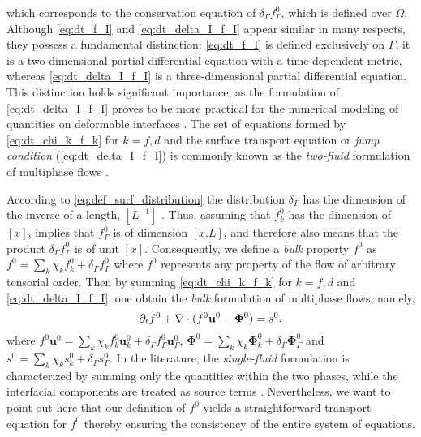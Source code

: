 which corresponds to the conservation equation of $\delta_\Gamma f_\Gamma^0$, which is defined over $\Omega$.
Although \ref{eq:dt_f_I} and \ref{eq:dt_delta_I_f_I} appear similar in many respects, they possess a fundamental distinction: \ref{eq:dt_f_I} is defined exclusively on $\Gamma$, it is a two-dimensional partial differential equation with a time-dependent metric, whereas \ref{eq:dt_delta_I_f_I} is a three-dimensional partial differential equation. 
This distinction holds significant importance, as the formulation of \ref{eq:dt_delta_I_f_I} proves to be more practical for the numerical modeling of quantities on deformable interfaces \citep{teigen2009}. %
The set of equations formed by \ref{eq:dt_chi_k_f_k} for $k = f,d$ and the surface transport equation or \textit{jump condition} (\ref{eq:dt_delta_I_f_I}) is commonly known as the \textit{two-fluid} formulation of multiphase flows \citep{morel2015mathematical,tryggvason2011direct,drew1983mathematical,kataoka1986local}. 

According to \ref{eq:def_surf_distribution} the distribution  $\delta_\Gamma$ has the dimension of the inverse of a length, $[L^{-1}]$ \citep{appel2007}. 
Thus, assuming that $f_k^0$ has the dimension of $[x]$, implies that $f_\Gamma^0$ is of dimension $[x.L]$, and therefore also means that the product $\delta_\Gamma f_\Gamma^0$ is of unit $[x]$.
Consequently, we define a \textit{bulk} property $f^0$ as $f^0 = \sum_{k} \chi_k f_k^0 + \delta_\Gamma  f_\Gamma^0$ where $f^0$ represents any property of the flow of arbitrary tensorial order.
Then by summing \ref{eq:dt_chi_k_f_k} for $k=f,d$ and \ref{eq:dt_delta_I_f_I}, one obtain the \textit{bulk} formulation of multiphase flows, namely,%
\begin{equation}
   \pddt f^0
   + \div (
       f^0\textbf{u}^0
       -  \mathbf{\Phi}^0 
    )
   = s^0. 
   \label{eq:dt_f}
\end{equation}
where $f^0 \textbf{u}^0 = \sum_{k} \chi_k {f}_k^0\textbf{u}_k^0 + \delta_\Gamma  {f}_\Gamma^0\textbf{u}_\Gamma^0$, $\mathbf{\Phi}^0 = \sum_{k} \chi_k \mathbf{\Phi}_k^0 + \delta_\Gamma  \mathbf{\Phi}_\Gamma^0$ and $s^0 = \sum_{k} \chi_k s_k^0 + \delta_\Gamma  s_\Gamma^0$. 
In the literature, the \textit{single-fluid} formulation is characterized by summing only the quantities within the two phases, while the interfacial components are treated as source terms \citep{tryggvason2011direct,morel2015mathematical}.
Nevertheless, we want to point out here that our definition of $f^0$ yields a straightforward transport equation for $f^0$ thereby ensuring the consistency of the entire system of equations.



